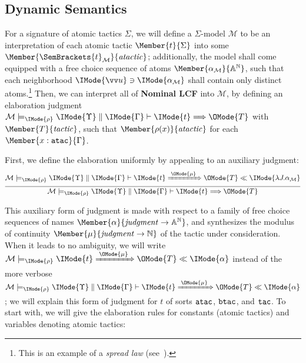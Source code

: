 \subsection{Dynamic Semantics}
\newcommand\LCFElab[4]{%
  \mathcal{M}\models_\IMode{\rho}
  \IMode{#1}\parallel\IMode{#2}\vdash%
  \IMode{#3}\Longrightarrow\OMode{#4}%
}

\newcommand\LCFElabSt[6]{%
  \mathcal{M}\models_\IMode{\rho}%
  \IMode{#3}\xRightarrow{\;\OMode{#6}\;}\OMode{#4}%
  \ll\IMode{#5}
}

\newcommand\LCFElabStVerbose[6]{%
  \mathcal{M}\models_\IMode{\rho}%
  \IMode{#1}\parallel\IMode{#2}\vdash%
  \IMode{#3}\xRightarrow{\;\OMode{#6}\;}\OMode{#4}%
  \ll\IMode{#5}
}


For a signature of atomic tactics $\Sigma$, we will define a $\Sigma$-model
$\mathcal{M}$ to be an interpretation of each atomic tactic
$\Member{t}{\Sigma}$ into some
$\Member{\SemBrackets{t}_\mathcal{M}}{\LCFAtomicTactic}$; additionally, the
model shall come equipped with a free choice sequence of atoms
$\Member{\alpha_\mathcal{M}}{\MLStream{\MLAtom}}$, such that each neighborhood
$\IMode{\vec{u}}\ni\IMode{\alpha_\mathcal{M}}$ shall contain only distinct
atoms.\footnote{This is an example of a \emph{spread law}
(see~\cite{brouwer:1981}).} Then, we can interpret all of \textbf{Nominal LCF}
into $\mathcal{M}$, by defining an elaboration judgment
$\LCFElab{\Upsilon}{\Gamma}{t}{T}$ with
$\Member{T}{\LCFTactic}$,
such that $\Member{\rho(x)}{\LCFAtomicTactic}$ for each
$\Member{x:\SortATac}{\Gamma}$.

First, we define the elaboration uniformly by appealing to an auxiliary judgment:
\[
  \infer{
    \LCFElab{\Upsilon}{\Gamma}{t}{T}
  }{
    \LCFElabStVerbose{\Upsilon}{\Gamma}{t}{T}{\lambda J.\alpha_\mathcal{M}}{\mu}
  }
\]

This auxiliary form of judgment is made with respect to a family of free choice
sequences of names $\Member{\alpha}{\LCFJudgment\to\MLStream{\MLAtom}}$, and
synthesizes the modulus of continuity $\Member{\mu}{\LCFJudgment\to\MLNat}$ of
the tactic under consideration.  When it leads to no ambiguity, we will write
$\LCFElabSt{\Upsilon}{\Gamma}{t}{T}{\alpha}{\mu}$ instead of the more
verbose $\LCFElabStVerbose{\Upsilon}{\Gamma}{t}{T}{\alpha}{\mu}$; we will
explain this form of judgment for $t$ of sorts $\mathtt{atac}$, $\mathtt{btac}$, and
$\mathtt{tac}$. To start with, we will give the elaboration rules for constants
(atomic tactics) and variables denoting atomic tactics:



